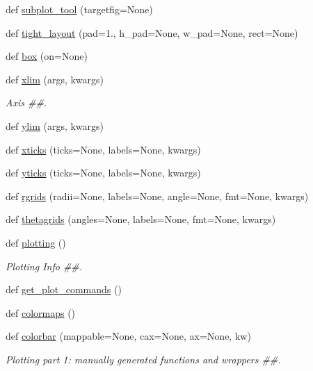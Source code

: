 \begin{DoxyCompactItemize}
\item 
def \hyperlink{namespacematplotlib_1_1pyplot_a6385e746bd6fa92de71a857ba628218e}{subplot\+\_\+tool} (targetfig=None)
\item 
def \hyperlink{namespacematplotlib_1_1pyplot_adc716fe003d7cfbfed0033f6370afcf1}{tight\+\_\+layout} (pad=1., h\+\_\+pad=None, w\+\_\+pad=None, rect=None)
\item 
def \hyperlink{namespacematplotlib_1_1pyplot_a5b1015ccc343f90ac116b6bcc2a362b4}{box} (on=None)
\item 
def \hyperlink{namespacematplotlib_1_1pyplot_aae2976660d4fc607b7c31e486f856f30}{xlim} (args, kwargs)
\begin{DoxyCompactList}\small\item\em Axis \#\#. \end{DoxyCompactList}\item 
def \hyperlink{namespacematplotlib_1_1pyplot_a9e2fdf635177a5c6158d666c7a5b77b4}{ylim} (args, kwargs)
\item 
def \hyperlink{namespacematplotlib_1_1pyplot_a53d2b671a9f59c58afdbe5030f9667e7}{xticks} (ticks=None, labels=None, kwargs)
\item 
def \hyperlink{namespacematplotlib_1_1pyplot_a1b854edfe7256308518a62ec48a6e7f3}{yticks} (ticks=None, labels=None, kwargs)
\item 
def \hyperlink{namespacematplotlib_1_1pyplot_a62a40fc608ac431ab64962b636ba0fc4}{rgrids} (radii=None, labels=None, angle=None, fmt=None, kwargs)
\item 
def \hyperlink{namespacematplotlib_1_1pyplot_a811c604e11c9ac8927b277e6e8204a6e}{thetagrids} (angles=None, labels=None, fmt=None, kwargs)
\item 
def \hyperlink{namespacematplotlib_1_1pyplot_a14828f067be9210c6de273069d27e091}{plotting} ()
\begin{DoxyCompactList}\small\item\em Plotting Info \#\#. \end{DoxyCompactList}\item 
def \hyperlink{namespacematplotlib_1_1pyplot_af6cbc41b6baf3fce6b0bd919f4e08174}{get\+\_\+plot\+\_\+commands} ()
\item 
def \hyperlink{namespacematplotlib_1_1pyplot_a83bb799a13540630c70ef40db0f182af}{colormaps} ()
\item 
def \hyperlink{namespacematplotlib_1_1pyplot_a1069e3a8f87355da5e901fde9b15c40e}{colorbar} (mappable=None, cax=None, ax=None, kw)
\begin{DoxyCompactList}\small\item\em Plotting part 1\+: manually generated functions and wrappers \#\#. \end{DoxyCompactList}\item 

\end{DoxyCompactItemize}
